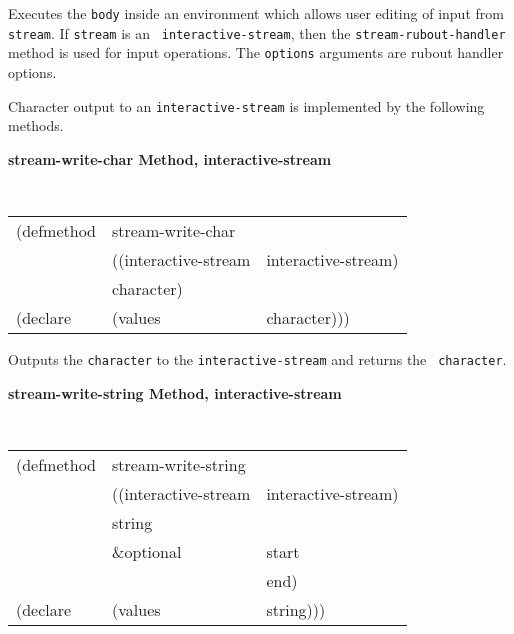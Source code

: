 \begin{flushright} \parbox[t]{6.125in}{
Executes the {\tt body} inside an environment which allows user editing
of input from {\tt stream}. If {\tt stream} is an {\tt
interactive-stream}, then the {\tt stream-rubout-handler}
method is used for input operations. The {\tt options} arguments are rubout
handler options. 
 
}
\end{flushright}


Character output to an {\tt interactive-stream} is implemented by the following
methods.

{\samepage
{\large {\bf stream-write-char \hfill Method, interactive-stream}}
\begin{flushright} \parbox[t]{6.125in}{
\tt
\begin{tabular}{lll}
\raggedright
(defmethod & stream-write-char & \\
& ((interactive-stream  &interactive-stream)\\
& character)\\
(declare &(values &character)))
\end{tabular}
\rm

}\end{flushright}}

\begin{flushright} \parbox[t]{6.125in}{
Outputs the {\tt character} to the {\tt interactive-stream} and returns the {\tt
character}.
 
}
\end{flushright}

{\samepage
{\large {\bf stream-write-string \hfill Method, interactive-stream}}
\begin{flushright} \parbox[t]{6.125in}{
\tt
\begin{tabular}{lll}
\raggedright
(defmethod & stream-write-string & \\
& ((interactive-stream  &interactive-stream)\\
& string\\
& \&optional & start \\
&            & end)\\
(declare &(values &string)))
\end{tabular}
\rm

}\end{flushright}}

